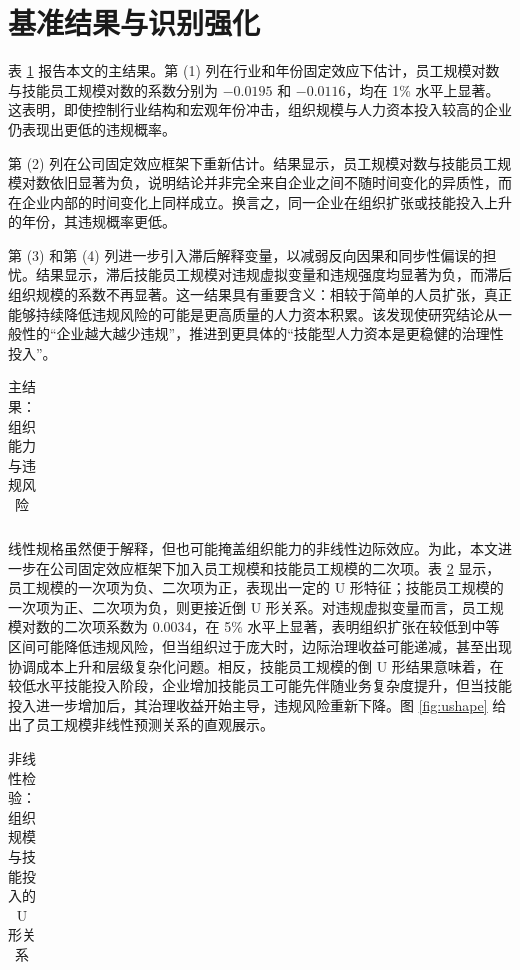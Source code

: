\documentclass[12pt]{ctexart}
\begin{document}
\section{基准结果与识别强化}
表 \ref{tab:main} 报告本文的主结果。第 (1) 列在行业和年份固定效应下估计，员工规模对数与技能员工规模对数的系数分别为 $-0.0195$ 和 $-0.0116$，均在 1\% 水平上显著。这表明，即使控制行业结构和宏观年份冲击，组织规模与人力资本投入较高的企业仍表现出更低的违规概率。

第 (2) 列在公司固定效应框架下重新估计。结果显示，员工规模对数与技能员工规模对数依旧显著为负，说明结论并非完全来自企业之间不随时间变化的异质性，而在企业内部的时间变化上同样成立。换言之，同一企业在组织扩张或技能投入上升的年份，其违规概率更低。

第 (3) 和第 (4) 列进一步引入滞后解释变量，以减弱反向因果和同步性偏误的担忧。结果显示，滞后技能员工规模对违规虚拟变量和违规强度均显著为负，而滞后组织规模的系数不再显著。这一结果具有重要含义：相较于简单的人员扩张，真正能够持续降低违规风险的可能是更高质量的人力资本积累。该发现使研究结论从一般性的“企业越大越少违规”，推进到更具体的“技能型人力资本是更稳健的治理性投入”。

\begin{table}[H]
\centering
\caption{主结果：组织能力与违规风险}
\label{tab:main}
\def\sym#1{\ifmmode^{#1}\else\(^{#1}\)\fi}
\begin{tabular}{l*{4}{c}}
\toprule
\\
\bottomrule
\end{tabular}
\end{table}

线性规格虽然便于解释，但也可能掩盖组织能力的非线性边际效应。为此，本文进一步在公司固定效应框架下加入员工规模和技能员工规模的二次项。表 \ref{tab:nonlinear} 显示，员工规模的一次项为负、二次项为正，表现出一定的 U 形特征；技能员工规模的一次项为正、二次项为负，则更接近倒 U 形关系。对违规虚拟变量而言，员工规模对数的二次项系数为 0.0034，在 5\% 水平上显著，表明组织扩张在较低到中等区间可能降低违规风险，但当组织过于庞大时，边际治理收益可能递减，甚至出现协调成本上升和层级复杂化问题。相反，技能员工规模的倒 U 形结果意味着，在较低水平技能投入阶段，企业增加技能员工可能先伴随业务复杂度提升，但当技能投入进一步增加后，其治理收益开始主导，违规风险重新下降。图 \ref{fig:ushape} 给出了员工规模非线性预测关系的直观展示。

\begin{table}[H]
\centering
\caption{非线性检验：组织规模与技能投入的 U 形关系}
\label{tab:nonlinear}
\def\sym#1{\ifmmode^{#1}\else\(^{#1}\)\fi}
\begin{tabular}{l*{2}{c}}
\toprule
\\
\bottomrule
\end{tabular}
\end{table}
\end{document}
